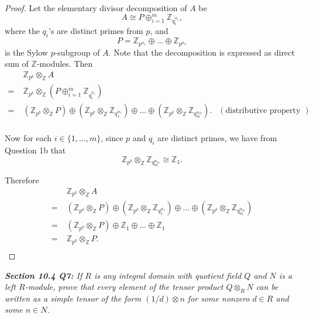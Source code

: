 \documentclass{article}
\begin{document}
  \begin{proof}
    Let the elementary divisor decomposition of $A$ be
    \[A\cong P\oplus_{i=1}^m\mathbb{Z}_{q_i^{\alpha_i}},\]
    where the $q_i$'s are distinct primes from $p$, and
    \[P=\mathbb{Z}_{p^{\alpha_1}}
    \oplus\ldots\oplus\mathbb{Z}_{p^{\alpha_n}}\]
    is the Sylow $p$-subgroup of $A$. Note that the decomposition is
    expressed as direct sum of $\mathbb{Z}$-modules. Then
    \begin{align*}
      &\;\mathbb{Z}_{p^k}\otimes_{\mathbb{Z}}A\\
      =&\;\mathbb{Z}_{p^k}\otimes_{\mathbb{Z}}
        (P\oplus_{i=1}^m \mathbb{Z}_{q_i^{\alpha_i}})\\
      =&\;(\mathbb{Z}_{p^k}\otimes_{\mathbb{Z}}P)
        \oplus(\mathbb{Z}_{p^k}
        \otimes_{\mathbb{Z}}\mathbb{Z}_{q_1^{\alpha_1}}) \oplus\ldots
        \oplus(\mathbb{Z}_{p^k}
        \otimes_{\mathbb{Z}}\mathbb{Z}_{q_m^{\alpha_m}}).
        &(\text{distributive property of tensors})\\
    \end{align*}

    Now for each $i\in\{1,\ldots,m\}$, since $p$ and $q_i$ are distinct
    primes, we have from Question 1b that
    \[\mathbb{Z}_{p^k} \otimes_{\mathbb{Z}}\mathbb{Z}_{q_m^{\alpha_m}}
    \cong\mathbb{Z}_1.\]

    Therefore
    \begin{align*}
      &\;\mathbb{Z}_{p^k}\otimes_{\mathbb{Z}}A\\
      =&\;(\mathbb{Z}_{p^k}\otimes_{\mathbb{Z}}P)
        \oplus(\mathbb{Z}_{p^k}
        \otimes_{\mathbb{Z}}\mathbb{Z}_{q_1^{\alpha_1}}) \oplus\ldots
        \oplus(\mathbb{Z}_{p^k}
        \otimes_{\mathbb{Z}}\mathbb{Z}_{q_m^{\alpha_m}})\\
      =&\;(\mathbb{Z}_{p^k}\otimes_{\mathbb{Z}}P) \oplus\mathbb{Z}_1
        \oplus\ldots \oplus\mathbb{Z}_1\\
      =&\;\mathbb{Z}_{p^k}\otimes_{\mathbb{Z}}P.\\
    \end{align*}
  \end{proof}

\it \textbf{Section 10.4 Q7:} If $R$ is any integral domain with quotient
  field $Q$ and $N$ is a left $R$-module, prove that every element of the
  tensor product $Q\otimes_R N$ can be written as a simple tensor of the
  form $(1/d)\otimes n$ for some nonzero $d\in R$ and some $n\in N$.
\end{document}
